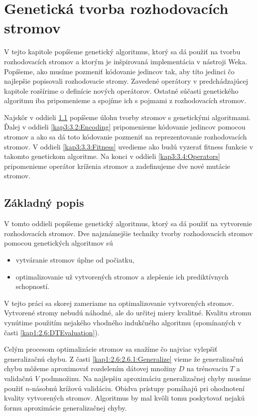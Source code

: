 \chapter{Genetická tvorba rozhodovacích stromov}
V tejto kapitole popíšeme genetický algoritmus, ktorý sa dá použiť na tvorbu rozhodovacích stromov a ktorým je inšpirovaná implementácia v nástroji Weka. Popíšeme, ako musíme pozmeniť kódovanie jedincov tak, aby títo jedinci čo najlepšie popisovali rozhodovacie stromy. Zavedené operátory v predchádzajúcej kapitole rozšírime o definície nových operátorov. Ostatné súčasti genetického algoritmu iba pripomenieme a spojíme ich s pojmami z rozhodovacích stromov.

Najskôr v oddieli \ref{kap3:3.1:Intro} popíšeme úlohu tvorby stromov s genetickými algoritmami. Ďalej v oddieli \ref{kap3:3.2:Encoding} pripomenieme kódovanie jedincov pomocou stromov a ako sa dá toto kódovanie pozmeniť na reprezentovanie rozhodovacích stromov. V oddieli \ref{kap3:3.3:Fitness} uvedieme ako budú vyzerať fitness funkcie v takomto genetickom algoritme. Na konci v oddieli \ref{kap3:3.4:Operators} pripomenieme operátor kríženia stromov a zadefinujeme dve nové mutácie stromov.
\section{Základný popis}\label{kap3:3.1:Intro}
V tomto oddieli popíšeme genetický algoritmus, ktorý sa dá použiť na vytvorenie rozhodovacích stromov. Dve najznámejšie techniky tvorby rozhodovacích stromov pomocou genetických algoritmov sú
\begin{itemize}
\item vytváranie stromov úplne od počiatku,
\item optimalizovanie už vytvorených stromov a zlepšenie ich prediktívnych schopností.
\end{itemize}
V tejto práci sa skorej zameriame na optimalizovanie vytvorených stromov. Vytvorené stromy nebudú náhodné, ale do určitej miery kvalitné. Kvalitu stromu vynútime použitím nejakého vhodného indukčného algoritmu (spomínaných v časti \ref{kap1:2.6:DTEvaluation}).

Celým procesom optimalizácie stromov sa snažíme čo najviac vylepšiť generalizačnú chybu. Z časti \ref{kap1:2.6:2.6.1:Generalize} vieme že generalizačnú chybu môžeme aproximovať rozdelením dátovej množiny $D$ na trénovaciu $T$ a validačnú $V$ podmnožinu. Na najlepšiu aproximáciu generalizačnej chyby musíme použiť $n$-násobnú krížovú validáciu. Obidva prístupy pomáhajú pri ohodnotení kvality vytvorených stromov. Algoritmus by mal kvôli tomu poskytovať nejakú formu aproximácie generalizačnej chyby.

